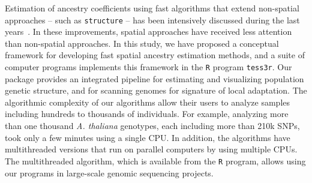 Estimation of ancestry coefficients using fast algorithms that extend
non-spatial approaches -- such as {\tt structure} -- has been intensively
discussed during the last years~\citep{Wollstein2015}. In these improvements,
spatial approaches have received less attention than non-spatial approaches. In
this study, we have proposed a conceptual framework for developing fast spatial
ancestry estimation methods, and a suite of computer programs implements this
framework in the {\tt R} program {\tt tess3r}. Our package provides an
integrated pipeline for estimating and visualizing population genetic structure,
and for scanning genomes for signature of local adaptation. The algorithmic
complexity of our algorithms allow their users to analyze samples including
hundreds to thousands of individuals. For example, analyzing more than one
thousand {\it A. thaliana} genotypes, each including more than 210k SNPs, took
only a few minutes using a single CPU. In addition, the algorithms have
multithreaded versions that run on parallel computers by using multiple CPUs.
The multithreaded algorithm, which is available from the {\tt R} program, allows
using our programs in large-scale genomic sequencing projects.


